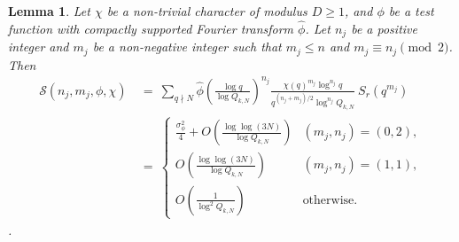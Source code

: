 \documentclass[12pt, reqno,oneside]{amsart}
\theoremstyle{plain}
\newtheorem{lemma}[theorem]{Lemma}
\theoremstyle{definition}
\theoremstyle{remark}
\theoremstyle{plain}
\numberwithin{equation}{section}
\begin{document}
\begin{lemma}\label{lemma:Nontrivial-Analysis}
Let $\chi$ be a non-trivial character of modulus $D\geq1$, and $\phi$ be a test function with compactly supported Fourier transform $\widehat{\phi}$. Let $n_j$ be a positive integer and $m_j$ be a non-negative integer such that $m_j\leq n$ and $m_j\equiv n_j\pmod{2}$. Then 
\begin{align}
\nonumber
\mathcal{S}(n_j,m_j,\phi,\chi) \ &= \ \sum_{q\nmid N}\widehat{\phi}\left(\frac{\log q}{\log Q_{k,N}}\right)^{n_j}\frac{\chi(q)^{m_j}\log^{n_j} q}{q^{(n_j+m_j)/2}\log^{n_j} Q_{k,N}} \ S_r\left(q^{m_j}\right) \\
&= \ 
\begin{cases}
\frac{\sigma_\phi^2}{4}+O\left(\frac{\log\log(3N)}{\log Q_{k,N}}\right) & (m_j,n_j)=(0,2), \\
O\left(\frac{\log\log(3N)}{\log Q_{k,N}}\right) & (m_j,n_j)=(1,1), \\
O\left(\frac{1}{\log^2Q_{k,N}}\right) & \text{otherwise}.
\end{cases}
\end{align}.
\end{lemma}
\end{document}
